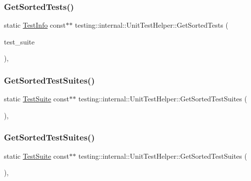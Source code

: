 \subsubsection{\texorpdfstring{GetSortedTests()}{GetSortedTests()}\hspace{0.1cm}{\footnotesize\ttfamily [3/3]}}
{\footnotesize\ttfamily static \mbox{\hyperlink{classtesting_1_1_test_info}{Test\+Info}} const$\ast$$\ast$ testing\+::internal\+::\+Unit\+Test\+Helper\+::\+Get\+Sorted\+Tests (\begin{DoxyParamCaption}\item[{const \mbox{\hyperlink{classtesting_1_1_test_suite}{Test\+Suite}} $\ast$}]{test\+\_\+suite }\end{DoxyParamCaption})\hspace{0.3cm}{\ttfamily [inline]}, {\ttfamily [static]}}

\mbox{\label{classtesting_1_1internal_1_1_unit_test_helper_a5704cd10fdef526c4c541fc53a24ed41}} 
\subsubsection{\texorpdfstring{GetSortedTestSuites()}{GetSortedTestSuites()}\hspace{0.1cm}{\footnotesize\ttfamily [1/2]}}
{\footnotesize\ttfamily static \mbox{\hyperlink{classtesting_1_1_test_suite}{Test\+Suite}} const$\ast$$\ast$ testing\+::internal\+::\+Unit\+Test\+Helper\+::\+Get\+Sorted\+Test\+Suites (\begin{DoxyParamCaption}{ }\end{DoxyParamCaption})\hspace{0.3cm}{\ttfamily [inline]}, {\ttfamily [static]}}

\mbox{\label{classtesting_1_1internal_1_1_unit_test_helper_a5704cd10fdef526c4c541fc53a24ed41}} 
\subsubsection{\texorpdfstring{GetSortedTestSuites()}{GetSortedTestSuites()}\hspace{0.1cm}{\footnotesize\ttfamily [2/2]}}
{\footnotesize\ttfamily static \mbox{\hyperlink{classtesting_1_1_test_suite}{Test\+Suite}} const$\ast$$\ast$ testing\+::internal\+::\+Unit\+Test\+Helper\+::\+Get\+Sorted\+Test\+Suites (\begin{DoxyParamCaption}{ }\end{DoxyParamCaption})\hspace{0.3cm}{\ttfamily [inline]}, {\ttfamily [static]}}



